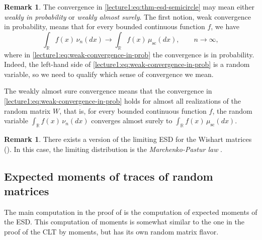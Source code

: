 \documentclass[letterpaper,11pt,oneside,reqno]{book}
\numberwithin{equation}{chapter}  %
\theoremstyle{definition}
\newtheorem{remark}[proposition]{Remark}
\begin{document}
\begin{remark}
	The convergence in \eqref{lecture1:eq:thm-esd-semicircle} may mean either
	\emph{weakly in probability} or \emph{weakly almost surely}.
	The first notion, weak convergence in probability, means that
	for every bounded continuous function $f$,
	we have
	\begin{equation}
		\label{lecture1:eq:weak-convergence-in-prob}
		\int_{\mathbb{R}} f(x) \, \nu_n(dx) \longrightarrow \int_{\mathbb{R}} f(x) \, \mu_{\mathrm{sc}}(dx),\qquad  n\to\infty,
	\end{equation}
	where in \eqref{lecture1:eq:weak-convergence-in-prob} the convergence is in probability.
	Indeed, the left-hand side of \eqref{lecture1:eq:weak-convergence-in-prob}
	is a random variable, so we need to qualify which sense of convergence we mean.

	The weakly almost sure convergence means that
	the convergence in \eqref{lecture1:eq:weak-convergence-in-prob}
	holds for almost all realizations of the random matrix $W$,
	that is, for every bounded continuous function $f$,
	the random variable
	$\int_{\mathbb{R}} f(x) \, \nu_n(dx)$ converges almost surely to
	$\int_{\mathbb{R}} f(x) \, \mu_{\mathrm{sc}}(dx)$.
\end{remark}

\begin{remark}
	There exists a version of the limiting
	ESD for the Wishart matrices
	().
	In this case, the limiting distribution is the
	\emph{Marchenko-Pastur law}
	\cite{MarchenkoPastur}.
\end{remark}

\subsection{Expected moments of traces of random matrices}

The main computation in the proof of
 is the computation of
expected moments of the ESD.
This computation of moments is somewhat similar
to the one in the proof of the CLT by moments,
but has its own random matrix flavor.
\end{document}
